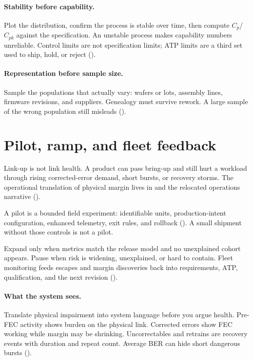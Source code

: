 \paragraph{Stability before capability.}
Plot the distribution, confirm the process is stable over time, then compute
$C_p$/$C_{pk}$ against the specification. An unstable process makes capability
numbers unreliable. Control limits are not specification limits; ATP limits are
a third set used to ship, hold, or reject
().

\paragraph{Representation before sample size.}
Sample the populations that actually vary: wafers or lots, assembly lines,
firmware revisions, and suppliers. Genealogy must survive rework. A large sample
of the wrong population still misleads
().

\section{Pilot, ramp, and fleet feedback}
\label{sec:productization-pilot}

Link-up is not link health. A product can pass bring-up and still hurt a
workload through rising corrected-error demand, short bursts, or recovery
storms. The operational translation of physical margin lives in
 and the relocated operations narrative
().

A pilot is a bounded field experiment: identifiable units, production-intent
configuration, enhanced telemetry, exit rules, and rollback
(). A small shipment without those
controls is not a pilot.

Expand only when metrics match the release model and no unexplained cohort
appears. Pause when risk is widening, unexplained, or hard to contain. Fleet
monitoring feeds escapes and margin discoveries back into requirements, ATP,
qualification, and the next revision
().

\paragraph{What the system sees.}
Translate physical impairment into system language before you argue health.
Pre-FEC activity shows burden on the physical link. Corrected errors show FEC
working while margin may be shrinking. Uncorrectables and retrains are recovery
events with duration and repeat count. Average BER can hide short dangerous
bursts ().

